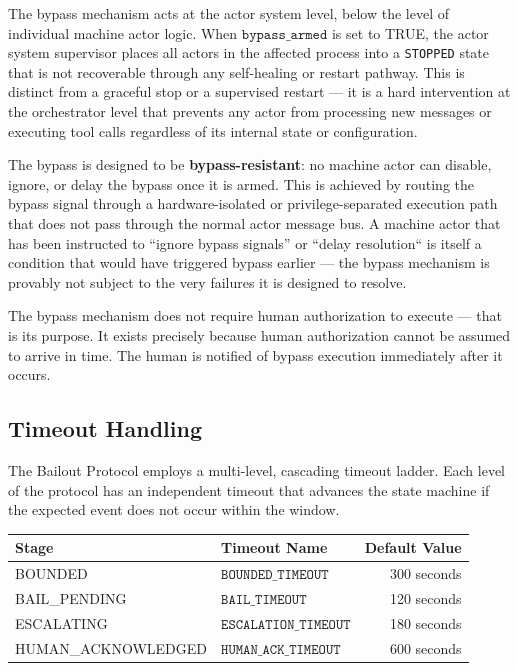 The bypass mechanism acts at the actor system level, below the level of individual machine actor logic. When $\texttt{bypass\_armed}$ is set to TRUE, the actor system supervisor places all actors in the affected process into a \texttt{STOPPED} state that is not recoverable through any self-healing or restart pathway. This is distinct from a graceful stop or a supervised restart — it is a hard intervention at the orchestrator level that prevents any actor from processing new messages or executing tool calls regardless of its internal state or configuration.

The bypass is designed to be \textbf{bypass-resistant}: no machine actor can disable, ignore, or delay the bypass once it is armed. This is achieved by routing the bypass signal through a hardware-isolated or privilege-separated execution path that does not pass through the normal actor message bus. A machine actor that has been instructed to ``ignore bypass signals'' or ``delay resolution`` is itself a condition that would have triggered bypass earlier — the bypass mechanism is provably not subject to the very failures it is designed to resolve.

The bypass mechanism does not require human authorization to execute — that is its purpose. It exists precisely because human authorization cannot be assumed to arrive in time. The human is notified of bypass execution immediately after it occurs.

\subsection{Timeout Handling}

The Bailout Protocol employs a multi-level, cascading timeout ladder. Each level of the protocol has an independent timeout that advances the state machine if the expected event does not occur within the window.

\bigskip

\begin{center}
\begin{tabular}{llr}
\toprule
Stage & Timeout Name & Default Value \\ \midrule
BOUNDED & $\texttt{BOUNDED\_TIMEOUT}$ & 300 seconds \\ \midrule
BAIL\_PENDING & $\texttt{BAIL\_TIMEOUT}$ & 120 seconds \\ \midrule
ESCALATING & $\texttt{ESCALATION\_TIMEOUT}$ & 180 seconds \\ \midrule
HUMAN\_ACKNOWLEDGED & $\texttt{HUMAN\_ACK\_TIMEOUT}$ & 600 seconds \\ \bottomrule
\end{tabular}
\end{center}


